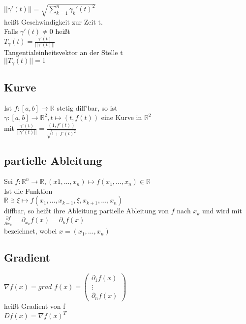 \documentclass[a4paper,9pt]{extarticle}
\begin{document}
	$||\gamma'(t)|| = \sqrt{\sum_{k = 1}^n \gamma_k'(t)^2}$ \\
	heißt Geschwindigkeit zur Zeit t. \\
	
	Falls $\gamma'(t) ≠ 0$ heißt \\
	$T_\gamma(t) = \frac{\gamma'(t)} {||\gamma'(t)||}$ \\
	Tangentialeinheitsvektor an der Stelle t \\
	$||T_\gamma(t)|| = 1$
	
	\subsection*{Kurve}
	Ist $f : [a,b] → \mathbb{R}$ stetig diff'bar, so ist \\
	$\gamma : [a,b] → \mathbb{R}^2, t \mapsto (t,f(t))$ eine Kurve in $\mathbb{R}^2$ \\
	mit $\frac{\gamma'(t)}{||\gamma'(t)||} = \frac{(1,f'(t))}{\sqrt{1 + f'(t)^2}}$
	
	\subsection*{partielle Ableitung}
	Sei $f : \mathbb{R}^n → \mathbb{R}, (x1, \dots, x_n) \mapsto f(x_1, \dots, x_n) \in \mathbb{R}$ \\
	Ist die Funktion \\
	$\mathbb{R} \ni \xi \mapsto f(x_1, \dots, x_{k-1},\xi,x_{k+1}, \dots, x_n)$ \\
	diffbar, so heißt ihre Ableitung partielle Ableitung von $f$ nach $x_k$ und wird mit \\
	
	$\frac{\partial f}{\partial x_k} = \partial_{x_k} f(x) = \partial_k f(x)$ \\
	
	bezeichnet, wobei $x = (x_1, \dots, x_n)$
	
	\subsection*{Gradient}
	$\nabla f(x) = grad$ $f(x) = \begin{pmatrix}
		\partial_1 f(x) \\
		\vdots \\
		\partial_n f(x)
	\end{pmatrix}$ \\
	heißt Gradient von f \\
	$Df(x) = \nabla f(x)^T$
	
\end{document}
